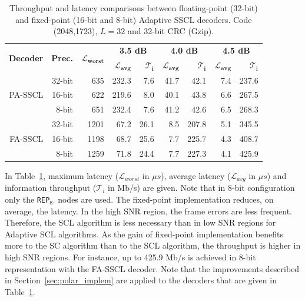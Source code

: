 \begin{table}
  \centering
  \caption{Throughput and latency comparisons between floating-point (32-bit)
    and fixed-point (16-bit and 8-bit) Adaptive SSCL decoders. Code (2048,1723),
    $L = 32$ and 32-bit CRC (Gzip).}
  \label{tab:eval_polar_scl_perfs_fixed}
  \begin{tabular}{r  r  r  r  r |  r  r | r  r}
    \multirow{2}{*}{\textbf{Decoder}} & \multirow{2}{*}{\textbf{Prec.}} & \multirow{2}{*}{$\bm{\mathcal{L}_{worst}}$} & \multicolumn{2}{c|}{\textbf{3.5 dB}} & \multicolumn{2}{c|}{\textbf{4.0 dB}} & \multicolumn{2}{c}{\textbf{4.5 dB}} \\
    \cline{4-9}
    & & & $\bm{\mathcal{L}_{avg}}$ & $\bm{\mathcal{T}_i}$ & $\bm{\mathcal{L}_{avg}}$ & $\bm{\mathcal{T}_i}$ & $\bm{\mathcal{L}_{avg}}$ & $\bm{\mathcal{T}_i}$ \\
    \hline
    \hline
    \multirow{3}{*}{PA-SSCL} & 32-bit &  635 & 232.3 &   7.6 & 41.7 &  42.1 & 7.4 & 237.6 \\
                             & 16-bit &  622 & 219.6 &   8.0 & 40.1 &  43.8 & 6.6 & 267.5 \\
                             &  8-bit &  651 & 232.4 &   7.6 & 41.2 &  42.6 & 6.5 & 268.3 \\
    \hline
    \multirow{3}{*}{FA-SSCL} & 32-bit & 1201 &  67.2 &  26.1 &  8.5 & 207.8 & 5.1 & 345.5 \\
                             & 16-bit & 1198 &  68.7 &  25.6 &  7.7 & 225.7 & 4.3 & 408.7 \\
                             &  8-bit & 1259 &  71.8 &  24.4 &  7.7 & 227.3 & 4.1 & 425.9 \\
  \end{tabular}
\end{table}

In Table~\ref{tab:eval_polar_scl_perfs_fixed}, maximum latency
($\mathcal{L}_{worst}$ in $\mu s$), average latency ($\mathcal{L}_{avg}$ in
$\mu s$) and information throughput ($\mathcal{T}_i$ in Mb/s) are given. Note
that in 8-bit configuration only the \texttt{REP}$_{\texttt{8-}}$ nodes are
used. The fixed-point implementation reduces, on average, the latency. In the
high SNR region, the frame errors are less frequent. Therefore, the SCL
algorithm is less necessary than in low SNR regions for Adaptive SCL algorithms.
As the gain of fixed-point implementation benefits more to the SC algorithm than
to the SCL algorithm, the throughput is higher in high SNR regions. For
instance, up to 425.9 Mb/s is achieved in 8-bit representation with the FA-SSCL
decoder. Note that the improvements described in Section~\ref{sec:polar_implem}
are applied to the decoders that are given in
Table~\ref{tab:eval_polar_scl_perfs_fixed}.

